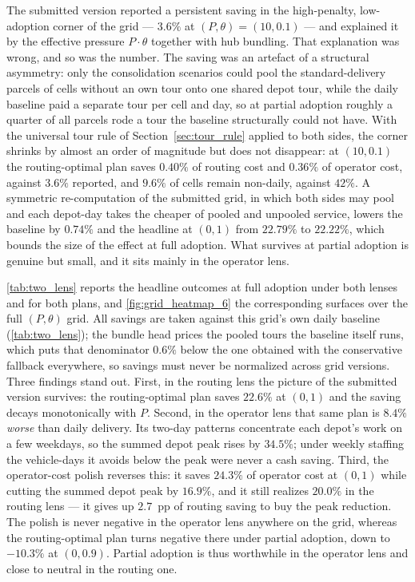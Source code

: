 \documentclass[preprint,12pt,authoryear]{elsarticle}
\begin{document}
The submitted version reported a persistent saving in the high-penalty, low-adoption corner of the grid --- $3.6\%$ at $(P, \theta) = (10, 0.1)$ --- and explained it by the effective pressure $P \cdot \theta$ together with hub bundling. That explanation was wrong, and so was the number. The saving was an artefact of a structural asymmetry: only the consolidation scenarios could pool the standard-delivery parcels of cells without an own tour onto one shared depot tour, while the daily baseline paid a separate tour per cell and day, so at partial adoption roughly a quarter of all parcels rode a tour the baseline structurally could not have. With the universal tour rule of Section~\ref{sec:tour_rule} applied to both sides, the corner shrinks by almost an order of magnitude but does not disappear: at $(10, 0.1)$ the routing-optimal plan saves $0.40\%$ of routing cost and $0.36\%$ of operator cost, against $3.6\%$ reported, and $9.6\%$ of cells remain non-daily, against $42\%$. A symmetric re-computation of the submitted grid, in which both sides may pool and each depot-day takes the cheaper of pooled and unpooled service, lowers the baseline by $0.74\%$ and the headline at $(0, 1)$ from $22.79\%$ to $22.22\%$, which bounds the size of the effect at full adoption. What survives at partial adoption is genuine but small, and it sits mainly in the operator lens.



\autoref{tab:two_lens} reports the headline outcomes at full adoption under both lenses and for both plans, and \autoref{fig:grid_heatmap_6} the corresponding surfaces over the full $(P, \theta)$ grid. All savings are taken against this grid's own daily baseline (\autoref{tab:two_lens}); the bundle head prices the pooled tours the baseline itself runs, which puts that denominator $0.6\%$ below the one obtained with the conservative fallback everywhere, so savings must never be normalized across grid versions. Three findings stand out. First, in the routing lens the picture of the submitted version survives: the routing-optimal plan saves $22.6\%$ at $(0, 1)$ and the saving decays monotonically with $P$. Second, in the operator lens that same plan is $8.4\%$ \emph{worse} than daily delivery. Its two-day patterns concentrate each depot's work on a few weekdays, so the summed depot peak rises by $34.5\%$; under weekly staffing the vehicle-days it avoids below the peak were never a cash saving. Third, the operator-cost polish reverses this: it saves $24.3\%$ of operator cost at $(0, 1)$ while cutting the summed depot peak by $16.9\%$, and it still realizes $20.0\%$ in the routing lens --- it gives up $2.7$~pp of routing saving to buy the peak reduction. The polish is never negative in the operator lens anywhere on the grid, whereas the routing-optimal plan turns negative there under partial adoption, down to $-10.3\%$ at $(0, 0.9)$. Partial adoption is thus worthwhile in the operator lens and close to neutral in the routing one.
\end{document}

